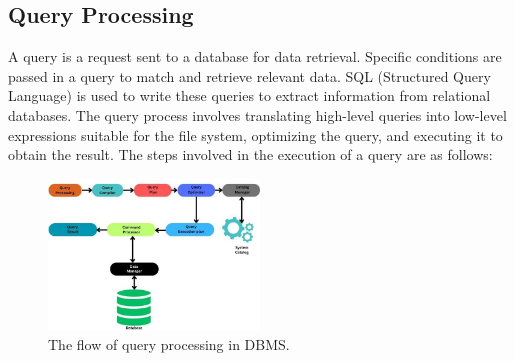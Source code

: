 \subsection{Query Processing }
A query is a request sent to a database for data retrieval. Specific conditions are passed in a query to match and retrieve relevant data. SQL (Structured Query Language) is used to write these queries to extract information from relational databases. The query process involves translating high-level queries into low-level expressions suitable for the file system, optimizing the query, and executing it to obtain the result. The steps involved in the execution of a query are as follows:\cite{wwwnaukricom-no-date}\\
\begin{figure}[h]
    \centering
    \includegraphics[width=0.5\textwidth]{Figure/Flow of QueryProcessing.jpg}
    \caption{The flow of query processing in DBMS.\cite{wwwnaukricom-no-date}}
    \label{fig:my_image}
\end{figure}
